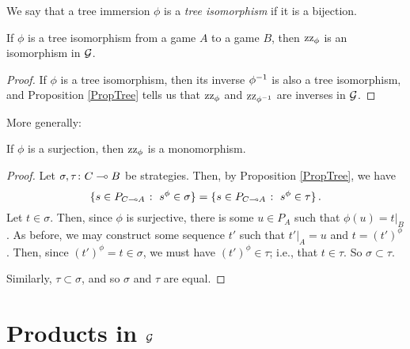 \begin{definition}
  We say that a tree immersion $\phi$ is a \emph{tree isomorphism} if it is a bijection.
\end{definition}

\begin{proposition}
  If $\phi$ is a tree isomorphism from a game $A$ to a game $B$, then $\operatorname{zz}_\phi$ is an isomorphism in $\mathcal G$.
\end{proposition}
\begin{proof}
  If $\phi$ is a tree isomorphism, then its inverse $\phi^{-1}$ is also a tree isomorphism, and Proposition \ref{PropTree} tells us that $\operatorname{zz}_\phi$ and $\operatorname{zz}_{\phi^{-1}}$ are inverses in $\mathcal G$.
\end{proof}

More generally:

\begin{proposition}
  If $\phi$ is a surjection, then $\operatorname{zz}_\phi$ is a monomorphism.
  \label{PropZigzagMono}
\end{proposition}
\begin{proof}
  Let $\sigma,\tau\colon C \multimap B$ be strategies.
  Then, by Proposition \ref{PropTree}, we have
  \[
    \{s\in P_{C\multimap A}\;\colon\; s^\phi\in\sigma\} = \{s\in P_{C\multimap A}\;\colon\; s^\phi\in\tau\}\,.
    \]
  Let $t\in\sigma$.  
  Then, since $\phi$ is surjective, there is some $u\in P_A$ such that $\phi(u)=t\vert_B$.  
  As before, we may construct some sequence $t'$ such that $t'\vert_A=u$ and $t=(t')^\phi$.  
  Then, since $(t')^\phi=t\in\sigma$, we must have $(t')^\phi\in\tau$; i.e., that $t\in\tau$.  
  So $\sigma\subset\tau$.  
  
  Similarly, $\tau\subset\sigma$, and so $\sigma$ and $\tau$ are equal.
\end{proof}

\section{Products in $\mathcal G$}

